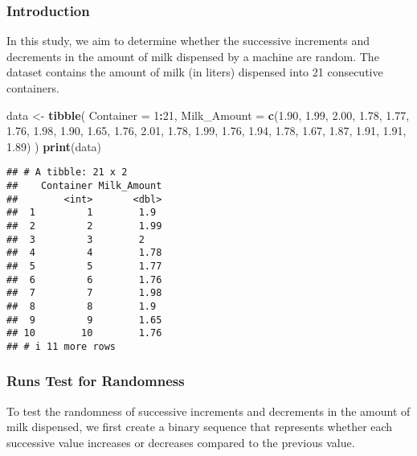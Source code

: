 \documentclass[
]{article}
\newenvironment{Shaded}{\begin{snugshade}}{\end{snugshade}}
\newcommand{\AttributeTok}[1]{\textcolor[rgb]{0.13,0.29,0.53}{#1}}
\newcommand{\DecValTok}[1]{\textcolor[rgb]{0.00,0.00,0.81}{#1}}
\newcommand{\FloatTok}[1]{\textcolor[rgb]{0.00,0.00,0.81}{#1}}
\newcommand{\FunctionTok}[1]{\textcolor[rgb]{0.13,0.29,0.53}{\textbf{#1}}}
\newcommand{\NormalTok}[1]{#1}
\newcommand{\OtherTok}[1]{\textcolor[rgb]{0.56,0.35,0.01}{#1}}
\newcommand{\SpecialCharTok}[1]{\textcolor[rgb]{0.81,0.36,0.00}{\textbf{#1}}}
\begin{document}
\subsubsection{Introduction}\label{introduction}

In this study, we aim to determine whether the successive increments and
decrements in the amount of milk dispensed by a machine are random. The
dataset contains the amount of milk (in liters) dispensed into 21
consecutive containers.

\begin{Shaded}
\begin{Highlighting}[]
\NormalTok{data }\OtherTok{\textless{}{-}} \FunctionTok{tibble}\NormalTok{(}
  \AttributeTok{Container =} \DecValTok{1}\SpecialCharTok{:}\DecValTok{21}\NormalTok{,}
  \AttributeTok{Milk\_Amount =} \FunctionTok{c}\NormalTok{(}\FloatTok{1.90}\NormalTok{, }\FloatTok{1.99}\NormalTok{, }\FloatTok{2.00}\NormalTok{, }\FloatTok{1.78}\NormalTok{, }\FloatTok{1.77}\NormalTok{, }\FloatTok{1.76}\NormalTok{, }\FloatTok{1.98}\NormalTok{, }\FloatTok{1.90}\NormalTok{, }\FloatTok{1.65}\NormalTok{, }\FloatTok{1.76}\NormalTok{,}
                  \FloatTok{2.01}\NormalTok{, }\FloatTok{1.78}\NormalTok{, }\FloatTok{1.99}\NormalTok{, }\FloatTok{1.76}\NormalTok{, }\FloatTok{1.94}\NormalTok{, }\FloatTok{1.78}\NormalTok{, }\FloatTok{1.67}\NormalTok{, }\FloatTok{1.87}\NormalTok{, }\FloatTok{1.91}\NormalTok{, }\FloatTok{1.91}\NormalTok{, }\FloatTok{1.89}\NormalTok{)}
\NormalTok{)}
\FunctionTok{print}\NormalTok{(data)}
\end{Highlighting}
\end{Shaded}

\begin{verbatim}
## # A tibble: 21 x 2
##    Container Milk_Amount
##        <int>       <dbl>
##  1         1        1.9 
##  2         2        1.99
##  3         3        2   
##  4         4        1.78
##  5         5        1.77
##  6         6        1.76
##  7         7        1.98
##  8         8        1.9 
##  9         9        1.65
## 10        10        1.76
## # i 11 more rows
\end{verbatim}

\subsubsection{Runs Test for Randomness}\label{runs-test-for-randomness}

To test the randomness of successive increments and decrements in the
amount of milk dispensed, we first create a binary sequence that
represents whether each successive value increases or decreases compared
to the previous value.
\end{document}
